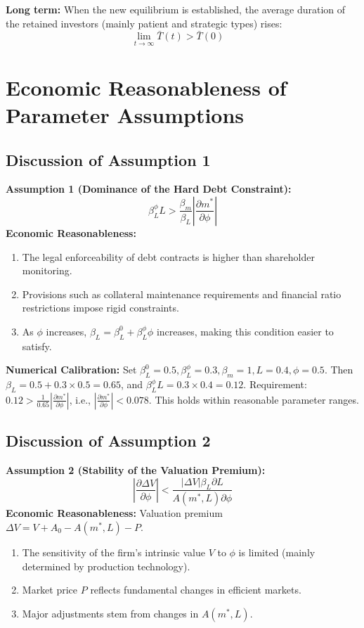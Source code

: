 \documentclass[12pt,a4paper]{article}
\begin{document}
\textbf{Long term:} When the new equilibrium is established, the average duration of the retained investors (mainly patient and strategic types) rises:
\begin{equation}
\lim_{t \to \infty} \bar{T}(t) > \bar{T}(0) \quad 
\end{equation}

\section{Economic Reasonableness of Parameter Assumptions}\label{app:H}
\subsection{Discussion of Assumption 1}
\textbf{Assumption 1 (Dominance of the Hard Debt Constraint):}
\begin{equation}
\beta_L^\phi L > \frac{\beta_m}{\beta_L} \left| \frac{\partial m^*}{\partial \phi} \right|
\end{equation}
\textbf{Economic Reasonableness:}
\begin{enumerate}
    \item The legal enforceability of debt contracts is higher than shareholder monitoring.
    \item Provisions such as collateral maintenance requirements and financial ratio restrictions impose rigid constraints.
    \item As $\phi$ increases, $\beta_L = \beta_L^0 + \beta_L^\phi \phi$ increases, making this condition easier to satisfy.
\end{enumerate}
\textbf{Numerical Calibration:} Set $\beta_L^0 = 0.5, \beta_L^\phi = 0.3, \beta_m = 1, L = 0.4, \phi = 0.5$.
Then $\beta_L = 0.5 + 0.3 \times 0.5 = 0.65$, and $\beta_L^\phi L = 0.3 \times 0.4 = 0.12$.
Requirement: $0.12 > \frac{1}{0.65} \left| \frac{\partial m^*}{\partial \phi} \right|$, i.e., $\left| \frac{\partial m^*}{\partial \phi} \right| < 0.078$. This holds within reasonable parameter ranges.

\subsection{Discussion of Assumption 2}
\textbf{Assumption 2 (Stability of the Valuation Premium):}
\begin{equation}
\left| \frac{\partial \Delta V}{\partial \phi} \right| < \frac{|\Delta V| \beta_L \partial L}{A(m^*, L) \partial \phi}
\end{equation}
\textbf{Economic Reasonableness:}
Valuation premium $\Delta V = V + A_0 - A(m^*, L) - P$.
\begin{enumerate}
    \item The sensitivity of the firm's intrinsic value $V$ to $\phi$ is limited (mainly determined by production technology).
    \item Market price $P$ reflects fundamental changes in efficient markets.
    \item Major adjustments stem from changes in $A(m^*, L)$.
\end{enumerate}
\end{document}
